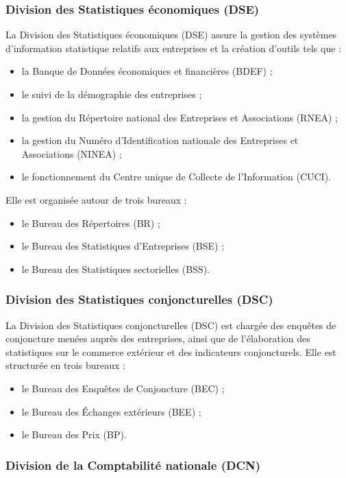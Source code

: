 \documentclass[12pt,a4paper]{report}
\begin{document}
\subsubsection{Division des Statistiques économiques (DSE)}

La Division des Statistiques économiques (DSE) assure la gestion des systèmes d'information statistique relatifs aux entreprises et la création d'outils tels que :
\begin{itemize}[nosep]
\item la Banque de Données économiques et financières (BDEF) ;
\item le suivi de la démographie des entreprises ;
\item la gestion du Répertoire national des Entreprises et Associations (RNEA) ;
\item la gestion du Numéro d'Identification nationale des Entreprises et Associations (NINEA) ;
\item le fonctionnement du Centre unique de Collecte de l'Information (CUCI).
\end{itemize}

Elle est organisée autour de trois bureaux :
\begin{itemize}[nosep]
\item le Bureau des Répertoires (BR) ;
\item le Bureau des Statistiques d'Entreprises (BSE) ;
\item le Bureau des Statistiques sectorielles (BSS).
\end{itemize}

\subsubsection{Division des Statistiques conjoncturelles (DSC)}

La Division des Statistiques conjoncturelles (DSC) est chargée des enquêtes de conjoncture menées auprès des entreprises, ainsi que de l'élaboration des statistiques sur le commerce extérieur et des indicateurs conjoncturels. Elle est structurée en trois bureaux :
\begin{itemize}[nosep]
\item le Bureau des Enquêtes de Conjoncture (BEC) ;
\item le Bureau des Échanges extérieurs (BEE) ;
\item le Bureau des Prix (BP).
\end{itemize}

\subsubsection{Division de la Comptabilité nationale (DCN)}
\end{document}
